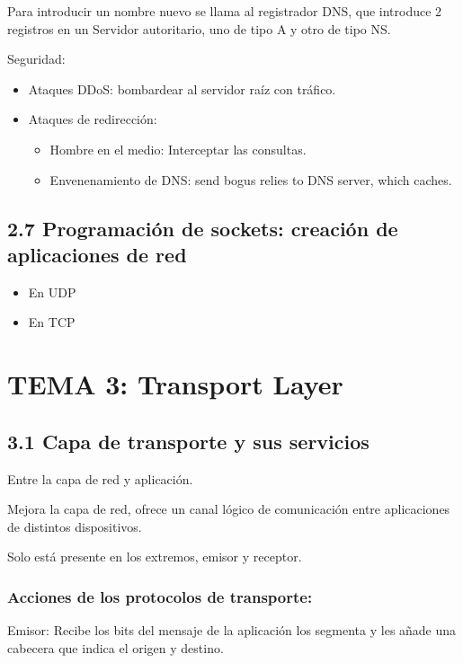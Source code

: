 \documentclass[12pt, twoside, openright]{report} %
\begin{document}
	Para introducir un nombre nuevo se llama al registrador DNS, que
    introduce 2 registros en un Servidor autoritario, uno de tipo A y
    otro de tipo NS.

	Seguridad:

    \begin{itemize}
    \item
      Ataques DDoS: bombardear al servidor raíz con tráfico.
    \item
      Ataques de redirección:

      \begin{itemize}
      \item
        Hombre en el medio: Interceptar las consultas.
      \item
        Envenenamiento de DNS: send bogus relies to DNS server, which
        caches.
      \end{itemize}
    \end{itemize}

\section{2.7 Programación de sockets: creación de aplicaciones de red}

  \begin{itemize}
  \item
    En UDP
  \item
    En TCP
  \end{itemize}

\chapter{TEMA 3: Transport Layer}

\section{3.1 Capa de transporte y sus servicios}
Entre la capa de red y aplicación.

Mejora la capa de red, ofrece un canal lógico de comunicación entre
    aplicaciones de distintos dispositivos.

	Solo está presente en los extremos, emisor y receptor.

\subsection{Acciones de los protocolos de transporte:}


    Emisor: Recibe los bits del mensaje de la aplicación los segmenta y
    les añade una cabecera que indica el origen y destino.
\end{document}
